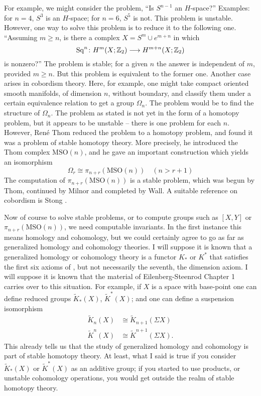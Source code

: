 \documentclass[../main]{subfiles}
\begin{document}
For example, we might consider the problem, ``Is $S^{n - 1}$ an $H$-space?'' Examples: for $n = 4$, $S^3$ is an $H$-space; for $n = 6$, $S^5$ is not. This problem is unstable. However, one way to solve this problem is to reduce it to the following one. ``Assuming $m \ge n$, is there a complex $X = S^m \cup e^{m + n}$ in which 
\[ \mathrm{Sq}^n \colon H^m(X; \mathbb{Z}_2) \longrightarrow H^{m + n}(X; \mathbb Z_2) \] is nonzero?'' The problem is stable; for a given $n$ the answer is independent of $m$, provided $m \ge n$. But this problem is equivalent to the former one.
Another case arises in cobordism theory. Here, for example, one might take compact oriented smooth manifolds, of dimension $n$, without boundary, and classify them under a certain equivalence relation to get a group $\Omega_n$. The problem would be to find the structure of $\Omega_n$. The problem as stated is not yet in the form of a homotopy problem, but it appears to be unstable -- there is one problem for each $n$. However, Ren\'e Thom reduced the problem to a homotopy problem, and found it was a problem of stable homotopy theory. More precisely, he introduced the Thom complex $\mathrm{MSO}(n)$, and he gave an important construction which yields an isomorphism \[ \Omega_r \cong \pi_{n + r}(\mathrm{MSO}(n)) \quad (n > r + 1)\]
The computation of $\pi_{n + r}(\mathrm{MSO}(n))$ is a stable problem, which was begun by Thom, continued by Milnor and completed by Wall. A suitable reference on cobordism is Stong \cite{stong2}. 

Now of course to solve stable problems, or to compute groups such as $[X, Y]$ or $\pi_{n + r}(\mathrm{MSO}(n))$, we need computable invariants. In the first instance this means homology and cohomology, but we could certainly agree to go as far as generalized homology and cohomology theories. I will suppose it is known that a generalized homology or cohomology theory is a functor $K_*$ or $K^*$ that satisfies the first six axioms of \cite{eilenbergsteenrod}, but not necessarily the seventh, the dimension axiom. I will suppose it is known that the material of Eilenberg-Steenrod Chapter 1 carries over to this situation. For example, if $X$ is a space with base-point one can define reduced groups $\tilde K_*(X)$, $\tilde K^*(X)$; and one can define a suspension isomorphism
\begin{align*}
    \tilde K_n(X) &\cong \tilde K_{n + 1}(\Sigma X)\\
    \tilde K^n(X) &\cong \tilde K^{n + 1}(\Sigma X).
\end{align*}
This already tells us that the study of generalized homology and cohomology is part of stable homotopy theory. At least, what I said is true if you consider $\tilde K_*(X)$ or $\tilde K^*(X)$ as an additive group; if you started to use products, or unstable cohomology operations, you would get outside the realm of stable homotopy theory.
\end{document}
